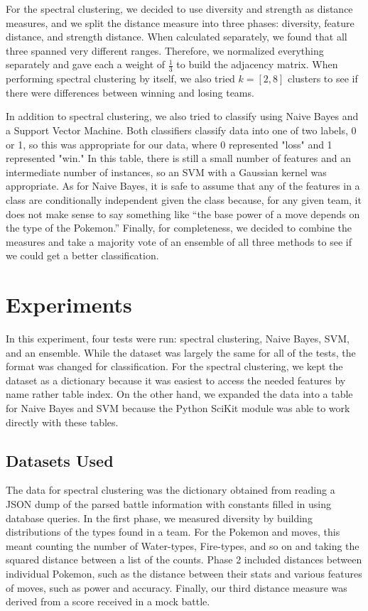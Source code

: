 \documentclass{acm_proc_article-sp}
\begin{document}
For the spectral clustering, we decided to use diversity and strength as distance measures, and we split the distance measure into three phases: diversity, feature distance, and strength distance. When calculated separately, we found that all three spanned very different ranges. Therefore, we normalized everything separately and gave each a weight of $\frac{1}{3}$ to build the adjacency matrix. When performing spectral clustering by itself, we also tried $k=[2, 8]$ clusters to see if there were differences between winning and losing teams.

In addition to spectral clustering, we also tried to classify using Naive Bayes and a Support Vector Machine. Both classifiers classify data into one of two labels, 0 or 1, so this was appropriate for our data, where 0 represented "loss" and 1 represented "win." In this table, there is still a small number of features and an intermediate number of instances, so an SVM with a Gaussian kernel was appropriate. As for Naive Bayes, it is safe to assume that any of the features in a class are conditionally independent given the class because, for any given team, it does not make sense to say something like “the base power of a move depends on the type of the Pokemon.” Finally, for completeness, we decided to combine the measures and take a majority vote of an ensemble of all three methods to see if we could get a better classification.

\section{Experiments}

In this experiment, four tests were run: spectral clustering, Naive Bayes, SVM, and an ensemble. While the dataset was largely the same for all of the tests, the format was changed for classification. For the spectral clustering, we kept the dataset as a dictionary because it was easiest to access the needed features by name rather table index. On the other hand, we expanded the data into a table for Naive Bayes and SVM because the Python SciKit module was able to work directly with these tables.

\subsection{Datasets Used}

The data for spectral clustering was the dictionary obtained from reading a JSON dump of the parsed battle information with constants filled in using database queries. In the first phase, we measured diversity by building distributions of the types found in a team. For the Pokemon and moves, this meant counting the number of Water-types, Fire-types, and so on and taking the squared distance between a list of the counts. Phase 2 included distances between individual Pokemon, such as the distance between their stats and various features of moves, such as power and accuracy. Finally, our third distance measure was derived from a score received in a mock battle.
\end{document}
